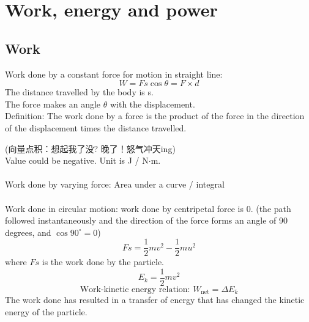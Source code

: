 \section{Work, energy and power}
\subsection{Work}
Work done by a constant force for motion in straight line:
\[W=Fs\cos\theta=F\times d\]
The distance travelled by the body is s. \\The force makes an angle $\theta$ with the displacement. \\Definition: The work done by a force is the product of the force in the direction of the displacement times the distance travelled.
\begin{center}
\end{center}
(向量点积：想起我了没? 晚了！怒气冲天ing)\\
Value could be negative. Unit is J / N$\cdot$m.\\\\
Work done by varying force: Area under a curve / integral\\\\
Work done in circular motion: work done by centripetal force is 0. (the path followed instantaneously and the direction of the force forms an angle of 90 degrees, and $\cos 90^\circ=0$)
\[Fs=\dfrac{1}{2}mv^2-\dfrac{1}{2}mu^2\]
where $Fs$ is the work done by the particle.
\[E_k=\dfrac{1}{2}mv^2\]
\[\text{Work-kinetic energy relation: }W_\text{net}=\Delta E_k\]
The work done has resulted in a transfer of energy that has changed the kinetic energy of the particle.\\\\
